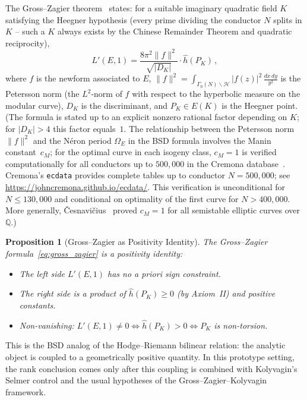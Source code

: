 \documentclass[aps,prd,twocolumn,superscriptaddress,nofootinbib,floatfix]{revtex4-2}
\newtheorem{proposition}[theorem]{Proposition}
\theoremstyle{definition}
\theoremstyle{remark}
\begin{document}
The Gross--Zagier theorem~\cite{GrossZagier1986} states: for a suitable imaginary quadratic field $K$ satisfying the Heegner hypothesis (every prime dividing the conductor $N$ splits in $K$ -- such a $K$ always exists by the Chinese Remainder Theorem and quadratic reciprocity),
\begin{equation}
L'(E,1) = \frac{8\pi^2 \|f\|^2}{\sqrt{|D_K|}} \cdot \hat{h}(P_K)\,,
\label{eq:gross_zagier}
\end{equation}
where $f$ is the newform associated to $E$, $\|f\|^2 = \int_{\Gamma_0(N) \backslash \mathcal{H}} |f(z)|^2 \, \frac{dx\,dy}{y^2}$ is the Petersson norm (the $L^2$-norm of $f$ with respect to the hyperbolic measure on the modular curve), $D_K$ is the discriminant, and $P_K \in E(K)$ is the Heegner point. (The formula is stated up to an explicit nonzero rational factor depending on $K$; for $|D_K| > 4$ this factor equals~$1$. The relationship between the Petersson norm $\|f\|^2$ and the Néron period $\Omega_E$ in the BSD formula involves the Manin constant~$c_M$; for the optimal curve in each isogeny class, $c_M = 1$ is verified computationally for all conductors up to $500{,}000$ in the Cremona database~\cite{LMFDB}. Cremona's \texttt{ecdata} provides complete tables up to conductor $N = 500{,}000$; see \url{https://johncremona.github.io/ecdata/}. This verification is unconditional for $N \leq 130{,}000$ and conditional on optimality of the first curve for $N > 400{,}000$. More generally, Česnavičius~\cite{Cesnavicius2018} proved $c_M = 1$ for all semistable elliptic curves over~$\mathbb{Q}$.)

\begin{proposition}[Gross--Zagier as Positivity Identity]
\label{prop:gz_positivity}
The Gross--Zagier formula~\eqref{eq:gross_zagier} is a positivity identity:
\begin{itemize}
\item The left side $L'(E,1)$ has no a priori sign constraint.
\item The right side is a product of $\hat{h}(P_K) \geq 0$ (by Axiom~II) and positive constants.
\item Non-vanishing: $L'(E,1) \neq 0 \iff \hat{h}(P_K) > 0 \iff P_K$ is non-torsion.
\end{itemize}
\end{proposition}

This is the BSD analog of the Hodge--Riemann bilinear relation: the analytic object is coupled to a geometrically positive quantity. In this prototype setting, the rank conclusion comes only after this coupling is combined with Kolyvagin's Selmer control and the usual hypotheses of the Gross--Zagier--Kolyvagin framework.
\end{document}
